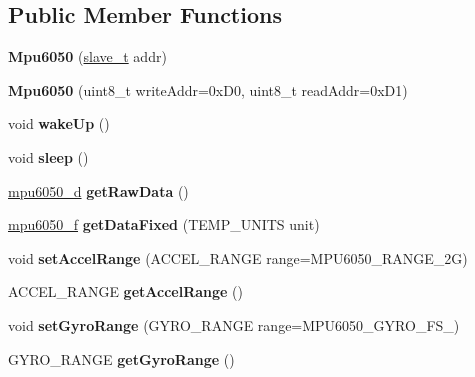 \subsection*{Public Member Functions}
\begin{DoxyCompactItemize}
\item 
\mbox{\label{classMpu6050_a66c02083300656955c6ab4825a9a2cf7}} 
{\bfseries Mpu6050} (\mbox{\hyperlink{structslave__t}{slave\+\_\+t}} addr)
\item 
\mbox{\label{classMpu6050_ada44fc04a552a9f0ac78e8406958f372}} 
{\bfseries Mpu6050} (uint8\+\_\+t write\+Addr=0x\+D0, uint8\+\_\+t read\+Addr=0x\+D1)
\item 
\mbox{\label{classMpu6050_a066832c484d51f19bca711291eb8b6f6}} 
void {\bfseries wake\+Up} ()
\item 
\mbox{\label{classMpu6050_aad083177a7f103792055e0fffdabc99c}} 
void {\bfseries sleep} ()
\item 
\mbox{\label{classMpu6050_adff3dea805b3277544f2a1055ab88b82}} 
\mbox{\hyperlink{structmpu6050__d}{mpu6050\+\_\+d}} {\bfseries get\+Raw\+Data} ()
\item 
\mbox{\label{classMpu6050_a454db86b0f6deaec49bec03104fbc36b}} 
\mbox{\hyperlink{structmpu6050__f}{mpu6050\+\_\+f}} {\bfseries get\+Data\+Fixed} (T\+E\+M\+P\+\_\+\+U\+N\+I\+TS unit)
\item 
\mbox{\label{classMpu6050_aec4a6223578c5b5ec218c549b529acfc}} 
void {\bfseries set\+Accel\+Range} (A\+C\+C\+E\+L\+\_\+\+R\+A\+N\+GE range=M\+P\+U6050\+\_\+\+R\+A\+N\+G\+E\+\_\+2G)
\item 
\mbox{\label{classMpu6050_a09ea34d6c38da2353cb7162404f08da6}} 
A\+C\+C\+E\+L\+\_\+\+R\+A\+N\+GE {\bfseries get\+Accel\+Range} ()
\item 
\mbox{\label{classMpu6050_a7b9f3b74955abf148a7f7e9a2de00819}} 
void {\bfseries set\+Gyro\+Range} (G\+Y\+R\+O\+\_\+\+R\+A\+N\+GE range=M\+P\+U6050\+\_\+\+G\+Y\+R\+O\+\_\+\+F\+S\+\_)
\item 
\mbox{\label{classMpu6050_a97ff9e30c5af6767b44cce16f317c877}} 
G\+Y\+R\+O\+\_\+\+R\+A\+N\+GE {\bfseries get\+Gyro\+Range} ()
\end{DoxyCompactItemize}
